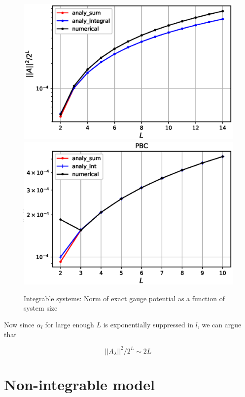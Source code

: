 \documentclass[11pt,a4paper]{article}
\begin{document}
\begin{figure}[!ht]
\begin{center}
\includegraphics[scale=0.52]{new_pics/OBC_int_comparing_num_anal_norm_L_scaling.eps}
\includegraphics[scale=0.52]{new_pics/PBC_int_comparing_num_anal_norm_L_scaling.eps}
\caption{Integrable systems: Norm of exact gauge potential as a function of system size }
\end{center}
\end{figure}



Now since $\alpha_l$ for large enough $L$ is exponentially suppressed in $l$, we can argue that


\begin{equation}
\boxed{||A_{\lambda}||^2 / 2^L \sim 2 L }
\end{equation}

\section{Non-integrable model}
\end{document}
